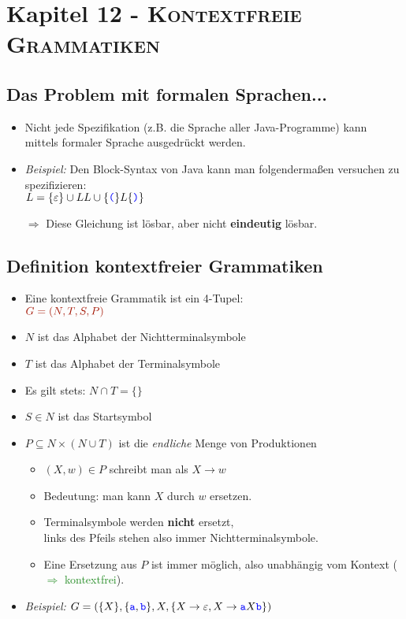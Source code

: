 \documentclass{article}
\newcommand{\kapitel}[2]{Kapitel #1 - \textsc{#2}}
\newcommand{\blue}[1]{\textcolor{blue}{#1}}
\newcommand{\strongColor}[1]{\textcolor{strongColor}{#1}}
\newcommand{\strong}[1]{\textbf{\strongColor{#1}}}
\newcommand{\important}[1]{\textcolor{importantColor}{#1}}
\newcommand{\verweis}[1]{\textcolor{ForestGreen}{#1}}
\newcommand{\example}[1]{\textit{Beispiel: }#1}
\newcommand{\word}[1]{\blue{\texttt{#1}}}
\newcommand{\set}[1]{\{#1\}}
\begin{document}
\newpage
\section{\kapitel{12}{Kontextfreie Grammatiken}}
\subsection{Das Problem mit formalen Sprachen...}
\begin{itemize}
    \item Nicht jede Spezifikation (z.B. die Sprache aller Java-Programme) kann mittels formaler Sprache ausgedrückt werden.
    \item \example{Den Block-Syntax von Java kann man folgendermaßen versuchen zu spezifizieren:\\$L=\set{\varepsilon}\cup LL\cup\set{\word{(}}L\set{\word{)}}$}
    \item[$\Rightarrow$]Diese Gleichung ist \important{lösbar}, aber nicht \important{\strong{eindeutig} lösbar}.
\end{itemize}

\subsection{Definition kontextfreier Grammatiken}
\begin{itemize}
    \item Eine kontextfreie Grammatik ist ein 4-Tupel:\\
    $\important{G=(N,T,S,P)}$
    \item \important{$N$} ist das Alphabet der \important{Nichtterminalsymbole}
    \item \important{$T$} ist das Alphabet der \important{Terminalsymbole}
    \item Es gilt stets: $N\cap T = \set{}$
    \item \important{$S \in N$} ist das \important{Startsymbol} 
    \item \important{$P \subseteq N \times (N\cup T)$} ist die \textit{endliche} Menge von \important{Produktionen}
    \begin{itemize}
        \item $(X, w) \in P$ schreibt man als $X \rightarrow w$
        \item Bedeutung: man kann $X$ durch $w$ ersetzen.
        \item Terminalsymbole werden \strong{nicht} ersetzt,\\links des Pfeils stehen also immer Nichtterminalsymbole.
        \item Eine Ersetzung aus $P$ ist immer möglich, also unabhängig vom Kontext (\verweis{$\Rightarrow$ kontextfrei}).
    \end{itemize}
    \item \example{$G=(\set{X}, \set{\word{a},\word{b}}, X, \set{X\rightarrow\varepsilon, X\rightarrow\word{a}X\word{b}})$}
\end{itemize}
\end{document}
